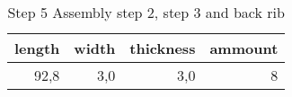 \begin{table}[h!]
\centering
\caption{Step 5 Assembly step 2, step 3 and back rib}
\begin{tabular}{rrrr}
\toprule
 length &  width &  thickness &  ammount \\
\midrule
   92,8 &    3,0 &        3,0 &        8 \\
\bottomrule
\end{tabular}
\end{table}
